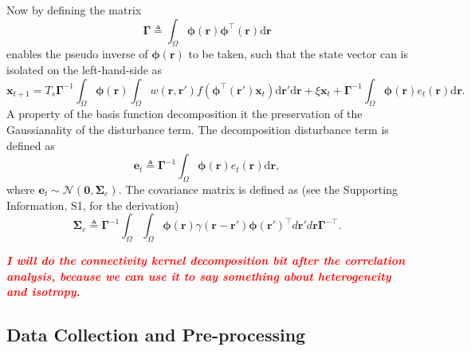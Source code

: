 \documentclass[]{article}
\newcommand{\dean}[1]{\textsf{\emph{\textbf{\textcolor{red}{#1}}}}}
\begin{document}
Now by defining the matrix
\begin{equation}\label{eq:DefGamma}
	\boldsymbol{\Gamma} \triangleq \int_\Omega {\boldsymbol{\phi} \left(\mathbf{r}\right)\boldsymbol{\phi} ^{\top}\left(\mathbf{r}\right)\textrm{d}\mathbf{r}} 
\end{equation}
enables the pseudo inverse of $\boldsymbol{\phi(\mathbf{r})}$ to be taken, such that the state vector can is isolated on the left-hand-side as
\begin{equation}\label{eq:ReducedForm}
	 \mathbf{x}_{t+1} = T_s\boldsymbol{\Gamma}^{-1}
	 \int_\Omega \boldsymbol{\phi}(\mathbf{r}) 
	 \int_\Omega w(\mathbf{r},\mathbf{r}')f(\boldsymbol{\phi}^{\top}(\mathbf{r}')\mathbf{x}_t) \textrm{d}\mathbf{r}' \textrm{d}\mathbf{r} 
	 + \xi\mathbf{x}_t + \boldsymbol{\Gamma}^{-1} \int_\Omega{\boldsymbol{\phi}(\mathbf{r}) e_t(\mathbf{r})\textrm{d}\mathbf{r}}.
\end{equation}
A property of the basis function decomposition it the preservation of the Gaussianality of the disturbance term. The decomposition disturbance term is defined as
\begin{equation}\label{eq:Wt} 
	\mathbf{e}_t \triangleq \boldsymbol{\Gamma}^{-1}\int_\Omega {\boldsymbol{\phi} ( \mathbf{r} )e_t( \mathbf{r} )\textrm{d}\mathbf{r}},
\end{equation}
where $\mathbf{e}_t \sim\mathcal{N}(\mathbf 0,\boldsymbol\Sigma_e)$. The covariance matrix is defined as (see the Supporting Information, S1, for the derivation)
\begin{equation}
	\boldsymbol\Sigma_e \triangleq \mathbf{\Gamma}^{-1}\int_{\Omega}\int_{\Omega}\boldsymbol{\phi}\left(\mathbf r\right) \gamma\left(\mathbf r- \mathbf r' \right)\boldsymbol{\phi}\left(\mathbf r'\right)^{\top}d\mathbf r' d\mathbf r\mathbf{\Gamma}^{- \top}. 
\end{equation}

\dean{I will do the connectivity kernel decomposition bit after the correlation analysis, because we can use it to say something about heterogeneity and isotropy.}

\subsection{Data Collection and Pre-processing}
\end{document}
